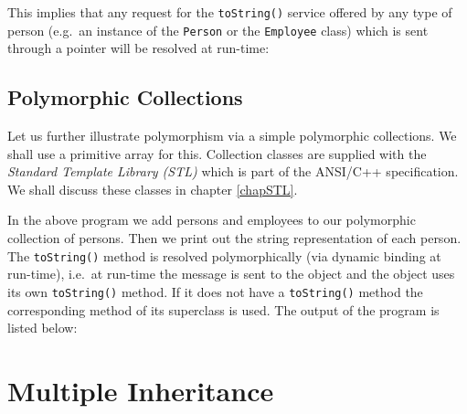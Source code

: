 
This implies that any request for the \verb+toString()+ service offered by
any type of person (e.g.\ an instance of the \verb+Person+ or the 
\verb+Employee+ class) which is sent through a pointer will be resolved at 
run-time:

\noindent {\small }


\subsection{Polymorphic Collections}

Let us further illustrate polymorphism via a simple polymorphic collections.
We shall use a primitive array for this. Collection classes are supplied with
the {\em Standard Template Library (STL)} which is part of the ANSI/C++
specification. We shall discuss these classes in chapter \ref{chapSTL}.

\noindent {\small }

In the above program we add persons and employees to our polymorphic collection 
of persons. Then we print out the string representation of each person. 
The \verb+toString()+ method is resolved polymorphically (via dynamic binding at run-time), 
i.e.\ at run-time the message is sent to the object and the object uses its
own \verb+toString()+ method. If it does not have a \verb+toString()+ method
the corresponding method of its superclass is used. 
The output of the program is listed below:



\section{Multiple Inheritance}


